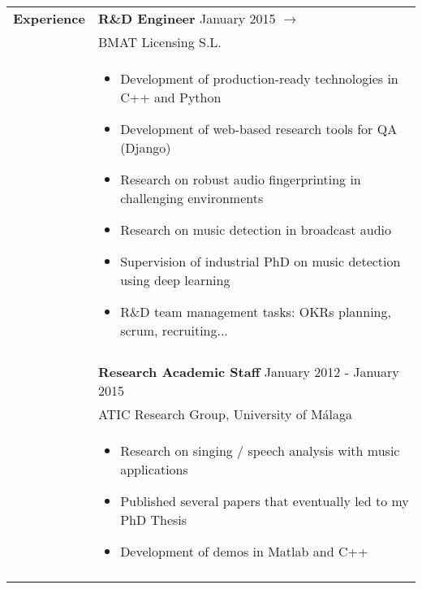 \documentclass[letterpaper,11pt,oneside]{article}
\begin{document}
\small
\noindent \begin{tabularx}{\linewidth}{l X}
 \Large{\textbf{Experience}}    & \textbf{R\&D Engineer} \hfill January 2015 $\rightarrow$\\
     & BMAT Licensing S.L.\\
     & \vspace{-0.1cm}\begin{itemize}[nosep,noitemsep,topsep=0pt,partopsep=0pt]
         \item Development of production-ready technologies in C++ and Python
         \item Development of web-based research tools for QA (Django) 
         \item Research on robust audio fingerprinting in challenging environments
         \item Research on music detection in broadcast audio
         \item Supervision of industrial PhD on music detection using deep learning
         \item R\&D team management tasks: OKRs planning, scrum, recruiting...
     \end{itemize}\\
     & \\
     & \textbf{Research Academic Staff} \hfill January 2012 - January 2015\\
     & ATIC Research Group, University of Málaga\\
     & \vspace{-0.1cm}\begin{itemize}[nosep,noitemsep,topsep=0pt,partopsep=0pt]
         \item Research on singing / speech analysis with music applications
         \item Published several papers that eventually led to my PhD Thesis
         \item Development of demos in Matlab and C++
     \end{itemize}\\
     \\
\end{tabularx}
\end{document}
